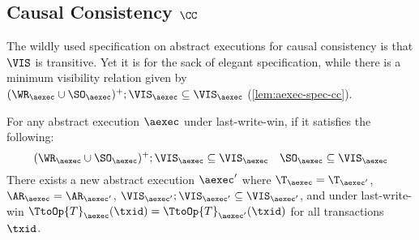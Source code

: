 \subsection{Causal Consistency \( \CC \)}
\label{sec:sound-complete-cc}

The wildly used specification on abstract executions for causal consistency is that \( \VIS \) is transitive.
Yet it is for the sack of elegant specification, while there is a minimum visibility relation given by \( (\WR_\aexec \cup \SO_\aexec)^{+} ; \VIS_\aexec \subseteq \VIS_\aexec \) (\cref{lem:aexec-spec-cc}).

\begin{lemma}
    \label{lem:aexec-spec-cc}
    For any abstract execution \( \aexec \) under last-write-win, if it satisfies the following:
    \[
        (\WR_\aexec \cup \SO_\aexec)^{+} ; \VIS_\aexec \subseteq \VIS_\aexec \quad \SO_\aexec \subseteq \VIS_\aexec
    \]
    There exists a new abstract execution \( \aexec' \) where \( \T_\aexec = \T_{\aexec'} \), \( \AR_\aexec = \AR_{\aexec'} \),
    \( \VIS_{\aexec'} ; \VIS_{\aexec'} \subseteq \VIS_{\aexec'} \), and
    under last-write-win \( \TtoOp{T}_{\aexec}(\txid) = \TtoOp{T}_{\aexec'}(\txid) \) for all transactions \( \txid \).
\end{lemma}
